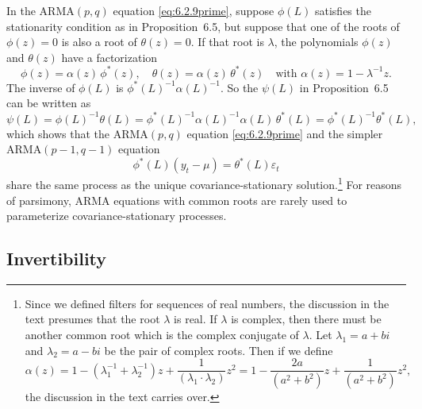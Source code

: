 In the $\text{ARMA}(p, q)$ equation \eqref{eq:6.2.9prime}, suppose $\phi(L)$ satisfies the stationarity condition
as in Proposition~6.5, but suppose that one of the roots of $\phi(z) = 0$ is also a root
of $\theta(z) = 0$. If that root is $\lambda$, the polynomials $\phi(z)$ and $\theta(z)$ have a factorization
\[
  \phi(z) = \alpha(z)\,\phi^*(z), \quad
  \theta(z) = \alpha(z)\,\theta^*(z) \quad
  \text{with } \alpha(z) = 1 - \lambda^{-1} z.
\]
The inverse of $\phi(L)$ is $\phi^*(L)^{-1} \alpha(L)^{-1}$. So the $\psi(L)$ in Proposition~6.5 can be
written as
\begin{equation}
  \psi(L) = \phi(L)^{-1} \theta(L)
           = \phi^*(L)^{-1} \alpha(L)^{-1} \alpha(L)\,\theta^*(L)
           = \phi^*(L)^{-1} \theta^*(L),
  \label{eq:6.2.12}
\end{equation}
which shows that the $\text{ARMA}(p, q)$ equation \eqref{eq:6.2.9prime} and the simpler $\text{ARMA}(p-1,
q-1)$ equation
\[
  \phi^*(L)(y_t - \mu) = \theta^*(L) \varepsilon_t
\]
share the same process as the unique covariance-stationary solution.\footnote{Since we defined filters for sequences of real numbers, the discussion in the text presumes that the root $\lambda$ is real. If $\lambda$ is complex, then there must be another common root which is the complex conjugate of $\lambda$. Let $\lambda_1 = a + bi$ and $\lambda_2 = a - bi$ be the pair of complex roots. Then if we define
\[
  \alpha(z) = 1 - (\lambda_1^{-1} + \lambda_2^{-1})z + \frac{1}{(\lambda_1 \cdot \lambda_2)} z^2
  = 1 - \frac{2a}{(a^2 + b^2)} z + \frac{1}{(a^2 + b^2)} z^2,
\]
the discussion in the text carries over.}
For reasons of parsimony, ARMA equations with common roots are rarely used to parameterize
covariance-stationary processes.

\subsection*{Invertibility}

